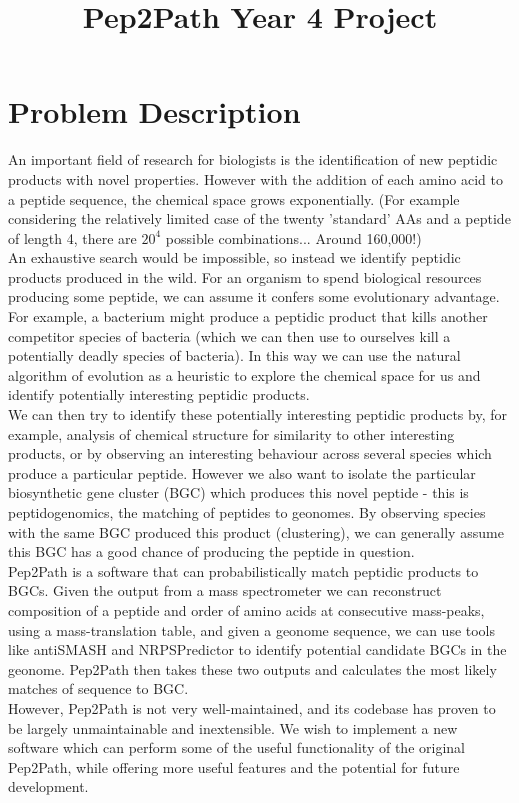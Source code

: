 \documentclass{article}
\title{Pep2Path Year 4 Project}
\begin{document}
\section*{Problem Description}

An important field of research for biologists is the identification of new peptidic products with novel properties.
However with the addition of each amino acid to a peptide sequence, the chemical space grows exponentially.
(For example considering the relatively limited case of the twenty 'standard' AAs and a peptide of length 4, there are
\(20^4\) possible combinations... Around 160,000!) \\

An exhaustive search would be impossible, so instead we identify peptidic products produced in the wild.
For an organism to spend biological resources producing some peptide, we can assume it confers some evolutionary advantage.
For example, a bacterium might produce a peptidic product that kills another competitor species of bacteria
(which we can then use to ourselves kill a potentially deadly species of bacteria).
In this way we can use the natural algorithm of evolution as a heuristic to explore the chemical space for us and identify potentially
interesting peptidic products. \\

We can then try to identify these potentially interesting peptidic products by, for example, analysis of chemical structure
for similarity to other interesting products, or by observing an interesting behaviour across several species which
produce a particular peptide. However we also want to isolate the particular biosynthetic gene cluster (BGC) which produces
this novel peptide - this is peptidogenomics, the matching of peptides to geonomes. 
By observing species with the same BGC produced this product (clustering), we can generally assume this BGC has a good chance of 
producing the peptide in question. \\

Pep2Path is a software that can probabilistically match peptidic products to BGCs. 
Given the output from a mass spectrometer we can reconstruct composition of a peptide and order of amino acids at consecutive mass-peaks, 
using a mass-translation table, and given a geonome sequence, we can use tools like antiSMASH and NRPSPredictor to 
identify potential candidate BGCs in the geonome. Pep2Path then takes these two outputs and calculates the most likely matches of
sequence to BGC. \\

However, Pep2Path is not very well-maintained, and its codebase has proven to be largely unmaintainable and inextensible.
We wish to implement a new software which can perform some of the useful functionality of the original Pep2Path,
while offering more useful features and the potential for future development. 
\end{document}
